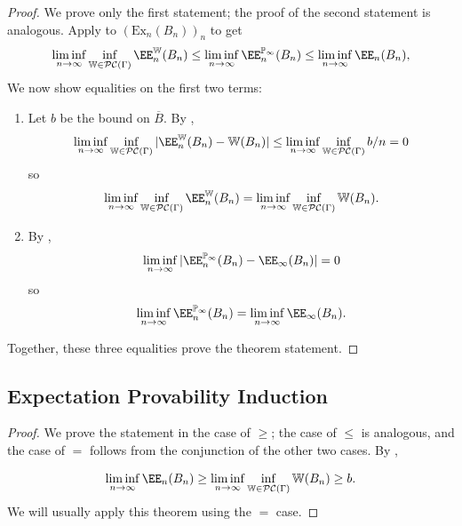 \documentclass[authordate,onecolumn,noenvironments]{miri-tech-article}
\numberwithin{equation}{subsection}
\newcommand{\seq}[1]{{\overline{#1}}}
\newcommand{\nn}{n}
\newcommand{\affluv}{B} %
\newcommand{\alta}{\mathrm{Ex}} %
\newcommand{\BelState}{\mathbb{P}}
\newcommand{\pt}{\BelState}
\newcommand{\cworlds}{\mathcal{P\-C}} %
\newcommand{\World}{\mathbb{W}}
\newcommand{\Theory}{\Gamma}
\begin{document}
\begin{proof}
  We prove only the first statement; the proof of the second statement is analogous.
  Apply  to $(\alta_n(\affluv_\nn))_n$ to get
  \[
    \liminf_{\nn\rightarrow\infty}\inf_{\World\in\cworlds(\Theory)}
      \EE_n^\World(\affluv_\nn )
    \le 
    \liminf_{\nn\rightarrow\infty}
    \EE_n^{\pt_\infty}(\affluv_\nn )
    \le \liminf_{\nn\to\infty}
    \EE_n(\affluv_\nn ),
  \]
  We now show equalities on the first two terms:
  \begin{enumerate}
    \item
      Let $b$ be the bound on $\seq\affluv$.  By ,
      \[
      \liminf_{\nn\rightarrow\infty}\inf_{\World\in\cworlds(\Theory)} |\EE_n^\World(\affluv_\nn ) - \World(\affluv_n)|
      \leq \liminf_{n \to \infty} \inf_{\World \in \cworlds(\Theory)} b/n = 0
      \]
      so
      \[
      \liminf_{\nn\rightarrow\infty}\inf_{\World\in\cworlds(\Theory)} \EE_n^\World(\affluv_\nn ) 
      =
      \liminf_{\nn\rightarrow\infty}\inf_{\World\in\cworlds(\Theory)} \World(\affluv_\nn ).
    \]
    \item
      By ,
      \[
      \liminf_{\nn\rightarrow\infty}
      |\EE_n^{\pt_\infty}(\affluv_\nn ) - \EE_\infty(\affluv_n)| = 0
      \]
      so
      \[
      \liminf_{\nn\rightarrow\infty}\EE_n^{\pt_\infty}(\affluv_\nn )
      =
      \liminf_{\nn\rightarrow\infty}\EE_\infty(\affluv_\nn ).
      \]
  \end{enumerate}
  Together, these three equalities prove the theorem statement.

\end{proof}

\subsection{Expectation Provability Induction}\label{app:expprovind}

\expprovind*

\begin{proof}

  We prove the statement in the case of $\geq$; the case of $\leq$ is analogous, and the case of $=$ follows from the conjunction of the other two cases.  By ,

  \[ \liminf_{n \to \infty} \EE_n(\affluv_n) \geq \liminf_{n \to \infty} \inf_{\World \in \cworlds(\Theory)} \World(\affluv_n) \geq b. \]
    We will usually apply this theorem using the $=$ case.


\end{proof}
\end{document}
